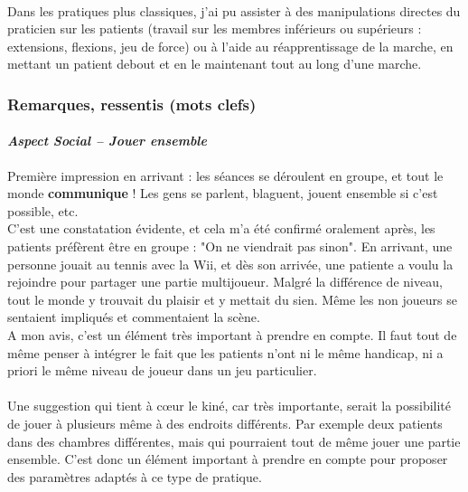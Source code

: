 \paragraph{}Dans les pratiques plus classiques, j'ai pu assister à des manipulations directes du praticien sur les patients (travail sur les membres inférieurs ou supérieurs : extensions, flexions, jeu de force) ou à l'aide au réapprentissage de la marche, en mettant un patient debout et en le maintenant tout au long d'une marche.

	\subsubsection*{Remarques, ressentis (mots clefs) }
		\paragraph{\emph{Aspect Social – Jouer ensemble}\\}
Première impression en arrivant : les séances se déroulent en groupe, et tout le monde \textbf{communique} !
Les gens se parlent, blaguent, jouent ensemble si c'est possible, etc. \\
C'est une constatation évidente, et cela m'a été confirmé oralement après, les patients préfèrent être en groupe : "On ne viendrait pas sinon". En arrivant, une personne jouait au tennis avec la Wii, et dès son arrivée, une patiente a voulu la rejoindre pour partager une partie multijoueur. Malgré la différence de niveau, tout le monde y trouvait du plaisir et y mettait du sien. Même les non joueurs se sentaient impliqués et commentaient la scène. \\
A mon avis, c'est un élément très important à prendre en compte. Il faut tout de même penser à intégrer le fait que les patients n'ont ni le même handicap, ni a priori le même niveau de joueur dans un jeu particulier.

\paragraph{}Une suggestion qui tient à cœur le kiné, car très importante, serait la possibilité de jouer à plusieurs même à des endroits différents. Par exemple deux patients dans des chambres différentes, mais qui pourraient tout de même jouer une partie ensemble. C'est donc un élément important à prendre en compte pour proposer des paramètres adaptés à ce type de pratique.

